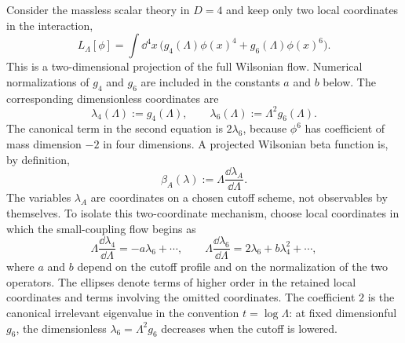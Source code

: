 Consider the massless scalar theory in \(D=4\) and keep only two local
coordinates in the interaction,
\begin{equation}
  L_\Lambda[\phi]
  =
  \int\dd^4x\,
  \bigl(g_4(\Lambda)\phi(x)^4+g_6(\Lambda)\phi(x)^6\bigr).
  \label{eq:quartic-sextic-truncation}
\end{equation}
This is a two-dimensional projection of the full Wilsonian flow.  Numerical
normalizations of \(g_4\) and \(g_6\) are included in the constants \(a\) and
\(b\) below.
The corresponding dimensionless coordinates are
\begin{equation}
  \lambda_4(\Lambda):=g_4(\Lambda),
  \qquad
  \lambda_6(\Lambda):=\Lambda^2g_6(\Lambda).
  \label{eq:lambda-four-six-definitions}
\end{equation}
The canonical term in the second equation is \(2\lambda_6\), because
\(\phi^6\) has coefficient of mass dimension \(-2\) in four dimensions.  A
projected Wilsonian beta function is, by definition,
\[
  \beta_A(\lambda):=\Lambda\frac{\dd\lambda_A}{\dd\Lambda}.
\]
The variables \(\lambda_A\) are coordinates on a chosen cutoff scheme, not
observables by themselves.  To isolate this two-coordinate mechanism, choose local
coordinates in which the small-coupling flow begins as
\begin{equation}
  \Lambda\frac{\dd\lambda_4}{\dd\Lambda}
  =
  -a\lambda_6+\cdots,
  \qquad
  \Lambda\frac{\dd\lambda_6}{\dd\Lambda}
  =
  2\lambda_6+b\lambda_4^2+\cdots ,
  \label{eq:quartic-sextic-beta-functions}
\end{equation}
where \(a\) and \(b\) depend on the cutoff profile and on the normalization of
the two operators.  The ellipses denote terms of higher order in the retained
local coordinates and terms involving the omitted coordinates.  The coefficient
\(2\) is the canonical irrelevant eigenvalue in the convention
\(t=\log\Lambda\): at fixed dimensionful \(g_6\), the dimensionless
\(\lambda_6=\Lambda^2g_6\) decreases when the cutoff is lowered.

